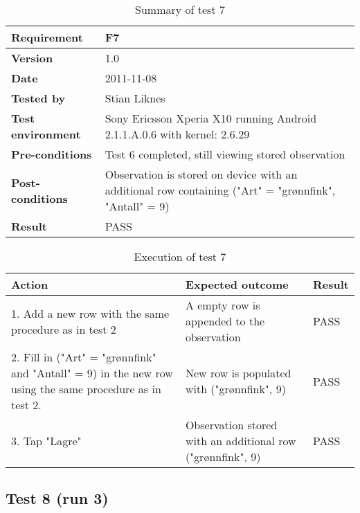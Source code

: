 	\begin{table}[htb]
		\centering
		\begin{tabular}{|p{3.5cm}|p{7.0cm}|} \hline
			\textbf{Requirement} & F7 \\ \hline
			\textbf{Version} & 1.0 \\ \hline
			\textbf{Date} & 2011-11-08 \\ \hline
			\textbf{Tested by} & Stian Liknes \\ \hline
			\textbf{Test environment} & Sony Ericsson Xperia X10 running Android 2.1.1.A.0.6 with kernel: 2.6.29 \\ \hline
			\textbf{Pre-conditions} & Test 6 completed, still viewing stored observation \\ \hline
			\textbf{Post-conditions} & Observation is stored on device with an additional row containing ("Art" = "grønnfink", "Antall" = 9) \\ \hline
			\textbf{Result} & PASS \\ \hline
		\end{tabular}
		\caption{Summary of test 7}
	\end{table}

	\begin{table}[htb]
		\centering
		\begin{tabular}{|p{5.0cm}|p{5.0cm}|p{1cm}|}
			\hline \textbf{Action} & \textbf{Expected outcome} & \textbf{Result} \\ \hline

			1. Add a new row with the same procedure as in test 2 &
			A empty row is appended to the observation &
			PASS \\ \hline

			2. Fill in ("Art" = "grønnfink" and "Antall" = 9) in the new row
			using the same procedure as in test 2. &
			New row is populated with ("grønnfink", 9) &
			PASS \\ \hline

			3. Tap "Lagre" &
			Observation stored with an additional row ("grønnfink", 9) &
			PASS \\ \hline

		\end{tabular}
		\caption{Execution of test 7}
	\end{table}

\newpage
\subsection*{Test 8 (run 3)}

